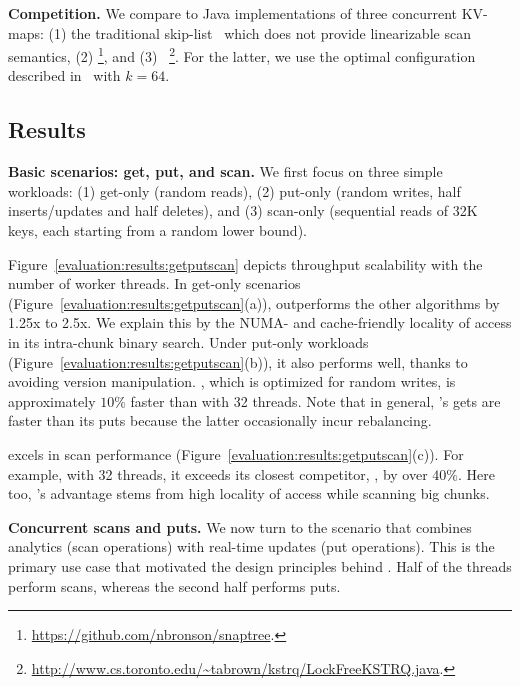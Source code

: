 \textbf{Competition.}
We compare {\kiwi} to Java implementations of three concurrent KV-maps: (1) the traditional 
skip-list~\cite{JavaConcurrentSkipList} which does not provide linearizable scan semantics, 
(2) {\snaptree}\cite{BronsonCCO2010}\footnote{\small{\url{https://github.com/nbronson/snaptree}}.}, 
and (3) {\kary}~\cite{BrownA12}\footnote{\small{\url{http://www.cs.toronto.edu/~tabrown/kstrq/LockFreeKSTRQ.java}}.}. 
For the latter, we use the optimal configuration described in~\cite{BrownA12} with $k=64$. 

\subsection{Results}

\textbf{Basic scenarios: get, put, and scan.} 
We first focus on three simple workloads: 
(1) get-only (random reads), 
(2) put-only (random writes, half inserts/updates and half deletes), and 
(3) scan-only (sequential reads of 32K keys, each starting from a random lower bound).  

Figure~\ref{evaluation:results:getputscan} depicts throughput scalability with the number of worker threads. 
In get-only scenarios (Figure~\ref{evaluation:results:getputscan}(a)), {\kiwi} outperforms the other 
algorithms by 1.25x to 2.5x. We explain this by the NUMA- and cache-friendly locality of access in its intra-chunk binary search. 
Under put-only workloads (Figure~\ref{evaluation:results:getputscan}(b)), it also performs well, thanks to avoiding version
manipulation. {\snaptree}, which is optimized for random writes, is approximately $10\%$ faster than {\kiwi}
with 32 threads. Note that in general, {\kiwi}'s gets are faster than its puts because the latter occasionally incur rebalancing. 

{\kiwi} excels in scan performance (Figure~\ref{evaluation:results:getputscan}(c)). 
For example, with 32 threads, it exceeds its closest competitor, {\kary}, by over $40\%$. 
Here too, {\kiwi}'s advantage stems from high locality of access while scanning big chunks. 

\textbf{Concurrent scans and puts.}
We now turn to the scenario that combines analytics (scan operations) with 
real-time updates (put operations). This is the primary use case that motivated 
the design principles behind {\kiwi}. Half of the threads perform scans, whereas 
the second half performs puts. 

